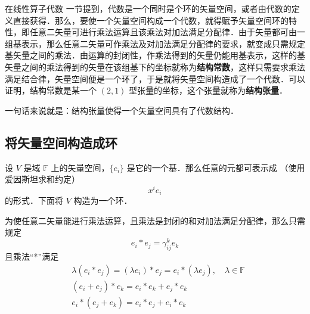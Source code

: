 
\begin{issues}
\issueDraft
\end{issues}

在线性算子代数 一节提到，代数是一个同时是个环的矢量空间，或者由代数的定义直接获得．那么，要使一个矢量空间构成一个代数，就得赋予矢量空间环的特性，即任意二矢量可进行乘法运算且该乘法对加法满足分配律．由于矢量都可由一组基表示，那么任意二矢量可作乘法及对加法满足分配律的要求，就变成只需规定基矢量之间的乘法．由运算的封闭性，作乘法得到的矢量仍能用基表示，这样的基矢量之间的乘法得到的矢量在该组基下的坐标就称为\textbf{结构常数}，这样只需要求乘法满足结合律，矢量空间便是一个环了，于是就将矢量空间构造成了一个代数．可以证明，结构常数是某一个 $(2,1)$ 型张量的坐标，这个张量就称为\textbf{结构张量}． 

一句话来说就是：结构张量使得一个矢量空间具有了代数结构．

\subsection{将矢量空间构造成环}
设 $V$ 是域 $\mathbb F$ 上的矢量空间，$\{e_i\}$ 是它的一个基．那么任意的元都可表示成 （使用爱因斯坦求和约定）
\begin{equation}
x^i e_i
\end{equation}
的形式．下面将 $V$ 构造为一个环．

为使任意二矢量能进行乘法运算，且乘法是封闭的和对加法满足分配律，那么只需规定
\begin{equation}\label{STAlg_eq1}
e_i*e_j=\gamma_{ij}^k e_k
\end{equation}
且乘法“*”满足
\begin{equation}
\begin{aligned}
&\lambda(e_i*e_j)=(\lambda e_i)*e_j=e_i*(\lambda e_j),\quad \lambda\in\mathbb F\\
&(e_i+e_j)*e_k=e_i*e_k+e_j*e_k\\
&e_i*(e_j+e_k)=e_i*e_j+e_i*e_k
\end{aligned}
\end{equation}

